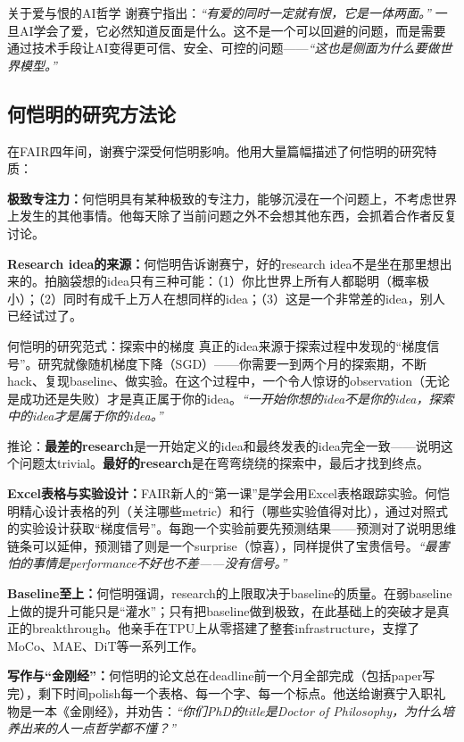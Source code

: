 \documentclass[a4paper]{article}
\begin{document}
\begin{warningbox}{关于爱与恨的AI哲学}
谢赛宁指出：\textit{``有爱的同时一定就有恨，它是一体两面。''} 一旦AI学会了爱，它必然知道反面是什么。这不是一个可以回避的问题，而是需要通过技术手段让AI变得更可信、安全、可控的问题——\textit{``这也是侧面为什么要做世界模型。''}
\end{warningbox}

\subsection{何恺明的研究方法论}

在FAIR四年间，谢赛宁深受何恺明影响。他用大量篇幅描述了何恺明的研究特质：

\textbf{极致专注力：}何恺明具有某种极致的专注力，能够沉浸在一个问题上，不考虑世界上发生的其他事情。他每天除了当前问题之外不会想其他东西，会抓着合作者反复讨论。

\textbf{Research idea的来源：}何恺明告诉谢赛宁，好的research idea不是坐在那里想出来的。拍脑袋想的idea只有三种可能：（1）你比世界上所有人都聪明（概率极小）；（2）同时有成千上万人在想同样的idea；（3）这是一个非常差的idea，别人已经试过了。

\begin{importantbox}{何恺明的研究范式：探索中的梯度}
真正的idea来源于探索过程中发现的``梯度信号''。研究就像随机梯度下降（SGD）——你需要一到两个月的探索期，不断hack、复现baseline、做实验。在这个过程中，一个令人惊讶的observation（无论是成功还是失败）才是真正属于你的idea。\textit{``一开始你想的idea不是你的idea，探索中的idea才是属于你的idea。''}

推论：\textbf{最差的research}是一开始定义的idea和最终发表的idea完全一致——说明这个问题太trivial。\textbf{最好的research}是在弯弯绕绕的探索中，最后才找到终点。
\end{importantbox}

\textbf{Excel表格与实验设计：}FAIR新人的``第一课''是学会用Excel表格跟踪实验。何恺明精心设计表格的列（关注哪些metric）和行（哪些实验值得对比），通过对照式的实验设计获取``梯度信号''。每跑一个实验前要先预测结果——预测对了说明思维链条可以延伸，预测错了则是一个surprise（惊喜），同样提供了宝贵信号。\textit{``最害怕的事情是performance不好也不差——没有信号。''}

\textbf{Baseline至上：}何恺明强调，research的上限取决于baseline的质量。在弱baseline上做的提升可能只是``灌水''；只有把baseline做到极致，在此基础上的突破才是真正的breakthrough。他亲手在TPU上从零搭建了整套infrastructure，支撑了MoCo、MAE、DiT等一系列工作。

\textbf{写作与``金刚经''：}何恺明的论文总在deadline前一个月全部完成（包括paper写完），剩下时间polish每一个表格、每一个字、每一个标点。他送给谢赛宁入职礼物是一本《金刚经》，并劝告：\textit{``你们PhD的title是Doctor of Philosophy，为什么培养出来的人一点哲学都不懂？''}
\end{document}
